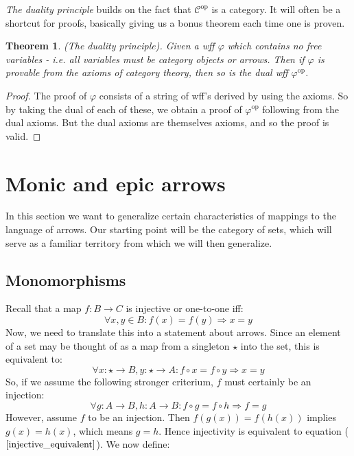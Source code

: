 \documentclass[12pt, a4paper]{article}
\newtheorem{theorem}{Theorem}[section]
\numberwithin{equation}{section}
\begin{document}
\textit{The duality principle} builds on the fact that $\mathcal{C}^{\textrm{op}}$ is a category. It will often be a shortcut for proofs, basically giving us a bonus theorem each time one is proven.

\begin{theorem}
(The duality principle). Given a wff $\varphi$ which contains no free variables - i.e. all variables must be category objects or arrows. Then if $\varphi$ is provable from the axioms of category theory, then so is the dual wff $\varphi^{\textrm{op}}$.
\end{theorem}
\begin{proof}
The proof of $\varphi$ consists of a string of wff's derived by using the axioms. So by taking the dual of each of these, we obtain a proof of $\varphi^{\textrm{op}}$ following from the dual axioms. But the dual axioms are themselves axioms, and so the proof is valid.
\end{proof}

\section{Monic and epic arrows}
In this section we want to generalize certain characteristics of mappings to the language of arrows. Our starting point will be the category of sets, which will serve as a familiar territory from which we will then generalize.

\subsection{Monomorphisms}
Recall that a map $f:B\rightarrow C$ is injective or one-to-one iff:
\begin{equation}
\forall x, y\in B: f(x)=f(y)\Rightarrow x=y
\end{equation}
Now, we need to translate this into a statement about arrows. Since an element of a set may be thought of as a map from a singleton $\star$ into the set, this is equivalent to:
\begin{equation}
\forall x:\star\rightarrow B, y:\star\rightarrow A:f\circ x=f\circ y\Rightarrow x=y
\end{equation}
So, if we assume the following stronger criterium, $f$ must certainly be an injection:
\begin{equation}
\label{injective_equivalent}
\forall g:A\rightarrow B, h:A\rightarrow B: f\circ g=f\circ h\Rightarrow f=g
\end{equation}
However, assume $f$ to be an injection. Then $f(g(x))=f(h(x))$ implies $g(x)=h(x)$, which means $g=h$. Hence injectivity is equivalent to equation ($\ref{injective_equivalent}$). We now define:
\end{document}

